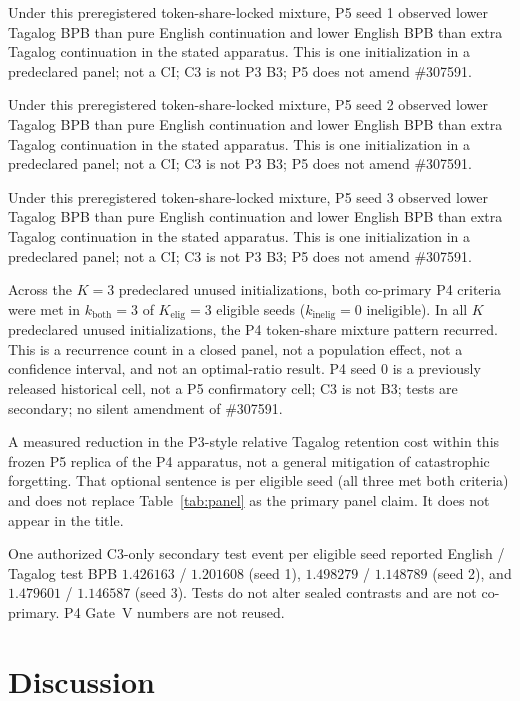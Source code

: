 \documentclass[11pt,a4paper]{article}
\begin{document}
Under this preregistered token-share-locked mixture, P5 seed 1 observed lower Tagalog BPB than pure English continuation and lower English BPB than extra Tagalog continuation in the stated apparatus. This is one initialization in a predeclared panel; not a CI; C3 is not P3 B3; P5 does not amend \#307591.

Under this preregistered token-share-locked mixture, P5 seed 2 observed lower Tagalog BPB than pure English continuation and lower English BPB than extra Tagalog continuation in the stated apparatus. This is one initialization in a predeclared panel; not a CI; C3 is not P3 B3; P5 does not amend \#307591.

Under this preregistered token-share-locked mixture, P5 seed 3 observed lower Tagalog BPB than pure English continuation and lower English BPB than extra Tagalog continuation in the stated apparatus. This is one initialization in a predeclared panel; not a CI; C3 is not P3 B3; P5 does not amend \#307591.

Across the $K=3$ predeclared unused initializations, both co-primary P4 criteria were met in $k_{\mathrm{both}}=3$ of $K_{\mathrm{elig}}=3$ eligible seeds ($k_{\mathrm{inelig}}=0$ ineligible). In all $K$ predeclared unused initializations, the P4 token-share mixture pattern recurred. This is a recurrence count in a closed panel, not a population effect, not a confidence interval, and not an optimal-ratio result. P4 seed 0 is a previously released historical cell, not a P5 confirmatory cell; C3 is not B3; tests are secondary; no silent amendment of \#307591.

A measured reduction in the P3-style relative Tagalog retention cost within this frozen P5 replica of the P4 apparatus, not a general mitigation of catastrophic forgetting. That optional sentence is per eligible seed (all three met both criteria) and does not replace Table~\ref{tab:panel} as the primary panel claim. It does not appear in the title.

One authorized C3-only secondary test event per eligible seed reported English / Tagalog test BPB $1.426163$ / $1.201608$ (seed 1), $1.498279$ / $1.148789$ (seed 2), and $1.479601$ / $1.146587$ (seed 3). Tests do not alter sealed contrasts and are not co-primary. P4 Gate~V numbers are not reused.

\section{Discussion}
\label{sec:disc}
\end{document}
